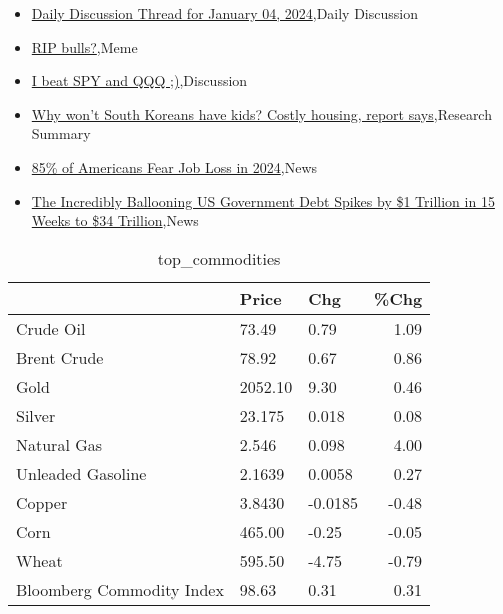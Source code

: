 \documentclass{article}%
\begin{document}
%
\begin{itemize}%
\item%
\href{https://reddit.com/r/wallstreetbets/comments/18yaiq5/daily\_discussion\_thread\_for\_january\_04\_2024/}{Daily Discussion Thread for January 04, 2024},Daily Discussion%
\item%
\href{https://reddit.com/r/wallstreetbets/comments/18y5rqt/rip\_bulls/}{RIP bulls?},Meme%
\item%
\href{https://reddit.com/r/StockMarket/comments/18y2xy0/i\_beat\_spy\_and\_qqq/}{I beat SPY and QQQ ;)},Discussion%
\item%
\href{https://reddit.com/r/Economics/comments/18y6io5/why\_wont\_south\_koreans\_have\_kids\_costly\_housing/}{Why won't South Koreans have kids? Costly housing, report says},Research Summary%
\item%
\href{https://reddit.com/r/Economics/comments/18y2ulz/85\_of\_americans\_fear\_job\_loss\_in\_2024/}{85\% of Americans Fear Job Loss in 2024},News%
\item%
\href{https://reddit.com/r/Economics/comments/18xzqit/the\_incredibly\_ballooning\_us\_government\_debt/}{The Incredibly Ballooning US Government Debt Spikes by \$1 Trillion in 15 Weeks to \$34 Trillion},News%
\end{itemize}%


\begin{table}[htbp]%
\caption{top\_commodities}%
\centering%
\begin{adjustbox}{width=1\textwidth}%
\begin{tabular}{lllr}
\toprule
                          &   Price &     Chg &  \%Chg \\
\midrule
               Crude Oil  &   73.49 &    0.79 &  1.09 \\
             Brent Crude  &   78.92 &    0.67 &  0.86 \\
                    Gold  & 2052.10 &    9.30 &  0.46 \\
                  Silver  &  23.175 &   0.018 &  0.08 \\
             Natural Gas  &   2.546 &   0.098 &  4.00 \\
       Unleaded Gasoline  &  2.1639 &  0.0058 &  0.27 \\
                  Copper  &  3.8430 & -0.0185 & -0.48 \\
                    Corn  &  465.00 &   -0.25 & -0.05 \\
                   Wheat  &  595.50 &   -4.75 & -0.79 \\
Bloomberg Commodity Index &   98.63 &    0.31 &  0.31 \\
\bottomrule
\end{tabular}
%
\end{adjustbox}%
\end{table}
\end{document}
